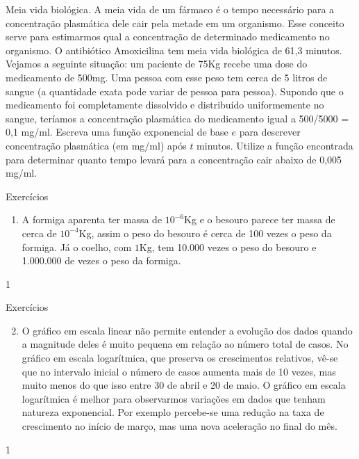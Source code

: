 \begin{task}{Meia vida biológica.}\label{Farmaco}
A meia vida de um fármaco é o tempo necessário para a concentração plasmática dele cair pela metade em um organismo. Esse conceito serve para estimarmos qual a concentração de determinado medicamento no organismo. O antibiótico Amoxicilina tem meia vida biológica de 61,3 minutos. Vejamos a seguinte situação: um paciente de 75Kg recebe uma dose do medicamento de 500mg. Uma pessoa com esse peso tem cerca de 5 litros de sangue (a quantidade exata pode variar de pessoa para pessoa). Supondo que o medicamento foi completamente dissolvido e distribuído uniformemente no sangue, teríamos a concentração plasmática do medicamento igual a 500/5000 = 0,1 mg/ml. Escreva uma função exponencial de base $e$ para descrever concentração plasmática (em mg/ml) após $t$ minutos. Utilize a função encontrada para determinar quanto tempo levará para a concentração cair abaixo de 0,005 mg/ml. 
\end{task}

\cleardoublepage

\exercise

\begin{answer}{Exercícios}
{\exerciselist

\begin{enumerate}

\item A formiga aparenta ter massa de $10^{-6}$Kg e o besouro parece ter massa de cerca de $10^{-4}$Kg, assim o peso do besouro é cerca de 100 vezes o peso da formiga. Já o coelho, com $1$Kg, tem 10.000 vezes o peso do besouro e 1.000.000 de vezes o peso da formiga.
\end{enumerate}
}{1}
\end{answer}

\clearmargin

\begin{answer}{Exercícios}
{
\exerciselist
\begin{enumerate}
\setcounter{enumi}{1}
\item O gráfico em escala linear não permite entender a evolução dos dados quando a magnitude deles é muito pequena em relação ao número total de casos. No gráfico em escala logarítmica, que preserva os crescimentos relativos, vê-se que no intervalo inicial o número de casos aumenta mais de 10 vezes, mas muito menos do que isso entre 30 de abril e 20 de maio. O gráfico em escala logarítmica é melhor para observarmos variações em dados que tenham natureza exponencial. Por exemplo percebe-se uma redução na taxa de crescimento no início de março, mas uma nova aceleração no final do mês.
\end{enumerate}
}{1}
\end{answer}

